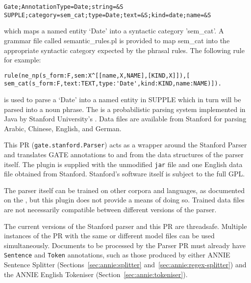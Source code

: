 \begin{small}\begin{verbatim}
Gate;AnnotationType=Date;string=&S
SUPPLE;category=sem_cat;type=Date;text=&S;kind=date;name=&S
\end{verbatim}\end{small}
which maps a named entity `Date' into a syntactic  category
'sem\_cat'.  A grammar file called semantic\_rules.pl is provided
to map sem\_cat into the appropriate  syntactic category expected by
the phrasal rules. The following rule for example:
\begin{small}\begin{verbatim}
rule(ne_np(s_form:F,sem:X^[[name,X,NAME],[KIND,X]]),[
sem_cat(s_form:F,text:TEXT,type:'Date',kind:KIND,name:NAME)]).
\end{verbatim}\end{small}
is used to parse a `Date' into a named entity in SUPPLE which in turn
will be parsed into a noun phrase.
The 
is a probabilistic parsing system implemented in Java by Stanford University's
.  Data
files are available from Stanford for parsing Arabic, Chinese, English, and
German.


This PR (\texttt{gate.stanford.Parser}) acts as a wrapper around the Stanford
Parser and translates GATE annotations to and from the data
structures of the parser itself.  The plugin is supplied with the unmodified
\texttt{jar} file and one English data file obtained from Stanford.  Stanford's
software itself is subject to the full GPL.


The parser itself can be trained on other corpora and languages, as documented
on the , but
this plugin does not provide a means of doing so.  Trained data files are not
necessarily compatible between different versions of the parser.

The current versions of the Stanford parser and this PR are threadsafe.
Multiple instances of the PR with the same or different model files can be used
simultaneously.
%
%
Documents to be processed by the Parser PR must already have
\texttt{Sentence} and \texttt{Token} annotations, such as those
produced by either ANNIE Sentence Splitter
(Sections~\ref{sec:annie:splitter} and~\ref{sec:annie:regex-splitter}) and the
ANNIE English Tokeniser (Section~\ref{sec:annie:tokeniser}).

